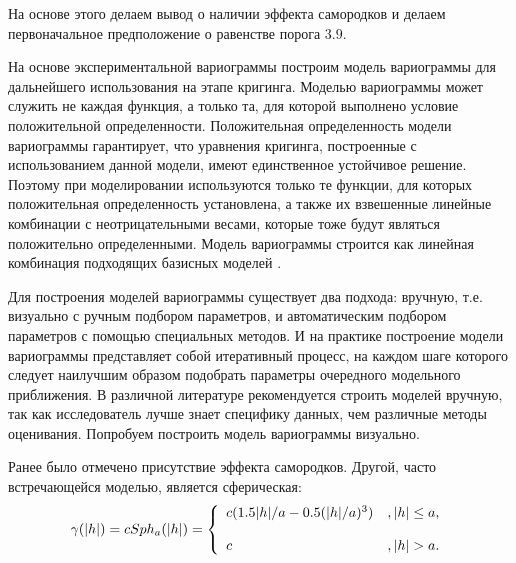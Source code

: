 На основе этого делаем вывод о наличии эффекта самородков и делаем первоначальное предположение о равенстве порога $3.9$.

На основе экспериментальной вариограммы построим модель вариограммы для дальнейшего использования на этапе кригинга. Моделью вариограммы может служить не каждая функция, а только та, для которой выполнено условие положительной определенности. Положительная определенность модели вариограммы гарантирует, что уравнения кригинга, построенные с использованием данной модели, имеют единственное устойчивое решение. Поэтому при моделировании используются только те функции, для которых положительная определенность установлена, а также их взвешенные линейные комбинации с неотрицательными весами, которые тоже будут являться положительно определенными. Модель вариограммы строится как линейная комбинация подходящих базисных моделей \cite{saveliev2012}.

Для построения моделей вариограммы существует два подхода: вручную, т.е. визуально с ручным подбором параметров, и автоматическим подбором параметров с помощью специальных методов. И на практике построение модели вариограммы представляет собой итеративный процесс, на каждом шаге которого следует наилучшим образом подобрать параметры очередного модельного приближения. В различной литературе рекомендуется строить моделей вручную, так как исследователь лучше знает специфику данных, чем различные методы оценивания. Попробуем построить модель вариограммы визуально.

Ранее было отмечено присутствие эффекта самородков. Другой, часто встречающейся моделью, является сферическая:
\begin{equation}
	\gamma(\vert h \vert) = c Sph_a(\vert h \vert) = \left\{
 \begin{array}{l l}
   c(1.5 \vert h \vert / a - 0.5(\vert h \vert / a)^3) &, \vert h \vert \le a, \\
   \\
   c &,	 \vert h \vert > a.
 \end{array} \right.
\end{equation}

